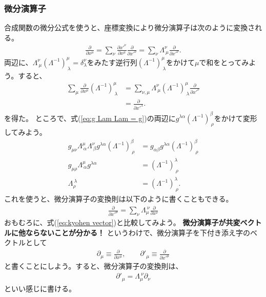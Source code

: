 \documentclass[10pt,a4paper]{jarticle}
\begin{document}
\subsubsection{微分演算子}
合成関数の微分公式を使うと、座標変換により微分演算子は次のように変換される。
\begin{align}
\frac{\partial}{\partial x^\mu}
= \sum_\nu \frac{\partial x'^\nu}{\partial x^\mu} \frac{\partial}{\partial x'^\nu}
= \sum_\nu \Lambda^\nu_{~\mu} \frac{\partial}{\partial x'^\nu}.
\end{align}
両辺に、$\Lambda^\nu_{~\mu} (\Lambda^{-1})^\mu_{~\lambda} = \delta^\nu_\lambda$をみたす逆行列$(\Lambda^{-1})^\mu_{~\lambda}$をかけて$\mu$で和をとってみよう。すると、
\begin{align}
\sum_\mu \frac{\partial}{\partial x^\mu} (\Lambda^{-1})^\mu_{~\lambda}
&= \sum_{\nu,\mu} \Lambda^\nu_{~\mu} (\Lambda^{-1})^\mu_{~\lambda} \frac{\partial}{\partial x'^\nu} \nonumber\\
&= \frac{\partial}{\partial x'^\lambda}.
\end{align}
を得た。
ところで、式(\ref{eq:g Lam Lam = g})の両辺に$g^{\lambda\alpha} (\Lambda^{-1})^\beta_{~\rho}$をかけて変形してみよう。
\begin{align}
g_{\mu\nu} \Lambda^\mu_{~\alpha} \Lambda^\nu_{~\beta} g^{\lambda\alpha} (\Lambda^{-1})^\beta_{~\rho}  &= g_{\alpha\beta} g^{\lambda\alpha} (\Lambda^{-1})^\beta_{~\rho} \nonumber\\
g_{\mu\rho} \Lambda^\mu_{~\alpha} g^{\lambda\alpha}  &= (\Lambda^{-1})^\lambda_{~\rho} \nonumber\\
\Lambda_\rho^{~\lambda}  &= (\Lambda^{-1})^\lambda_{~\rho}.
\end{align}
これを使うと、微分演算子の変換則は以下のように書くこともできる。
\begin{align}
\frac{\partial}{\partial x'^\mu} = \sum_\nu \Lambda_\mu^{~\nu} \frac{\partial}{\partial x^\nu}
\end{align}
おもむろに、式(\ref{eq:kyohen vector})と比較してみよう。
\textbf{微分演算子が共変ベクトルに他ならないことが分かる！}
というわけで、微分演算子を下付き添え字のベクトルとして
\begin{align}
\partial_\mu \equiv \frac{\partial}{\partial x^\mu}, \qquad
\partial'_\mu \equiv \frac{\partial}{\partial x'^\mu}
\end{align}
と書くことにしよう。すると、微分演算子の変換則は、
\begin{align}
\partial'_\mu = \Lambda_\mu^{~\nu} \partial_\nu
\end{align}
といい感じに書ける。
\end{document}
